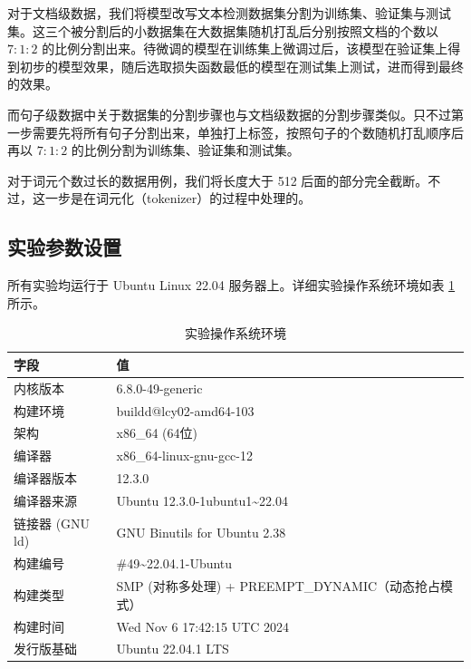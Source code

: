 对于文档级数据，我们将模型改写文本检测数据集分割为训练集、验证集与测试集。这三个被分割后的小数据集在大数据集随机打乱后分别按照文档的个数以 $7:1:2$ 的比例分割出来。待微调的模型在训练集上微调过后，该模型在验证集上得到初步的模型效果，随后选取损失函数最低的模型在测试集上测试，进而得到最终的效果。

而句子级数据中关于数据集的分割步骤也与文档级数据的分割步骤类似。只不过第一步需要先将所有句子分割出来，单独打上标签，按照句子的个数随机打乱顺序后再以 $7:1:2$ 的比例分割为训练集、验证集和测试集。

对于词元个数过长的数据用例，我们将长度大于 512 后面的部分完全截断。不过，这一步是在词元化（tokenizer）的过程中处理的。

\subsection{实验参数设置}
\label{sec:method-experiment-parameter}

所有实验均运行于 Ubuntu Linux 22.04 服务器上。详细实验操作系统环境如表 \ref{tab:os-env} 所示。

\begin{table}[htbp]
\centering
\caption{实验操作系统环境} \label{tab:os-env}
\begin{tabular}{ll}
\toprule
\textbf{字段}    & \textbf{值}                               \\ \midrule
内核版本           & 6.8.0-49-generic                         \\
构建环境           & buildd@lcy02-amd64-103                   \\
架构             & x86\_64 (64位)                             \\
编译器            & x86\_64-linux-gnu-gcc-12                  \\
编译器版本          & 12.3.0                                   \\
编译器来源          & Ubuntu 12.3.0-1ubuntu1\textasciitilde22.04             \\
链接器   (GNU ld) & GNU Binutils for Ubuntu 2.38             \\
构建编号           & \#49\textasciitilde22.04.1-Ubuntu                       \\
构建类型           & SMP (对称多处理) + PREEMPT\_DYNAMIC（动态抢占模式） \\
构建时间           & Wed Nov 6 17:42:15 UTC 2024              \\
发行版基础          & Ubuntu 22.04.1 LTS                       \\ \bottomrule
\end{tabular}
\end{table}


